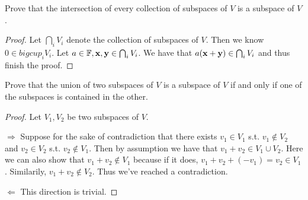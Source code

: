 \documentclass{extarticle}
\begin{document}
\begin{problem}{11}
    Prove that the intersection of every collection of subspaces of \(V\) is a subspace 
    of \(V\). 
\end{problem}

\begin{proof}
Let \(\bigcap_i V_i\) denote the collection of subspaces of \(V\). Then we know 
\(0 \in bigcup_i V_i\). Let \(a \in \mathbb{F}, \mathbf{x}, \mathbf{y} \in \bigcap_i V_i\). We have that
\(a(\mathbf{x} + \mathbf{y}) \in \bigcap_i V_i\) and thus finish the proof.
\end{proof}

\begin{problem}{12}
    Prove that the union of two subspaces of \(V\) is a subspace of \(V\) if 
    and only if one of the subspaces is contained in the other. 
\end{problem}

\begin{proof}
Let \(V_1, V_2\) be two subspaces of \(V\).

\(\Rightarrow\) Suppose for the sake of contradiction that 
there exists \(v_1 \in V_1\) s.t. \(v_1 \notin V_2\) and \(v_2 \in V_2\) s.t. 
\(v_2 \notin V_1\). Then by assumption we have that \(v_1 + v_2 \in V_1 \cup V_2\).
Here we can also show that \(v_1 + v_2 \notin V_1\) because if it does, \(v_1 +
v_2 + (-v_1) = v_2 \in V_1\). Similarily, \(v_1 + v_2 \notin V_2\). Thus we've reached
a contradiction. 

\(\Leftarrow\) This direction is trivial. 
\end{proof}



\end{document}
